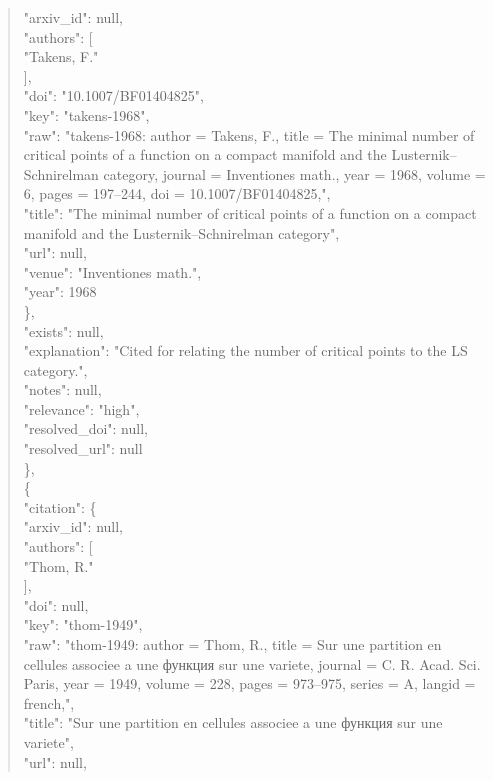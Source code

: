 \documentclass[11pt]{article}
\begin{document}
\begin{quote}
        "arxiv\_id": null,\\
        "authors": [\\
          "Takens, F."\\
        ],\\
        "doi": "10.1007/BF01404825",\\
        "key": "takens-1968",\\
        "raw": "takens-1968: author = Takens, F., title = The minimal number of critical points of a function on a compact manifold and the Lusternik--Schnirelman category, journal = Inventiones math., year = 1968, volume = 6, pages = 197--244, doi = 10.1007/BF01404825,",\\
        "title": "The minimal number of critical points of a function on a compact manifold and the Lusternik--Schnirelman category",\\
        "url": null,\\
        "venue": "Inventiones math.",\\
        "year": 1968\\
      \},\\
      "exists": null,\\
      "explanation": "Cited for relating the number of critical points to the LS category.",\\
      "notes": null,\\
      "relevance": "high",\\
      "resolved\_doi": null,\\
      "resolved\_url": null\\
    \},\\
    \{\\
      "citation": \{\\
        "arxiv\_id": null,\\
        "authors": [\\
          "Thom, R."\\
        ],\\
        "doi": null,\\
        "key": "thom-1949",\\
        "raw": "thom-1949: author = Thom, R., title = Sur une partition en cellules associee a une функция sur une variete, journal = C. R. Acad. Sci. Paris, year = 1949, volume = 228, pages = 973--975, series = A, langid = french,",\\
        "title": "Sur une partition en cellules associee a une функция sur une variete",\\
        "url": null,\\

\end{quote}
\end{document}

